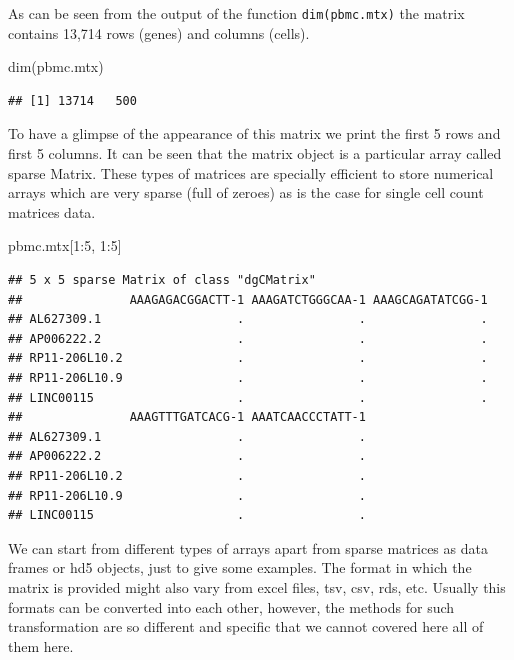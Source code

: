 \documentclass[
]{book}
\newenvironment{Shaded}{\begin{snugshade}}{\end{snugshade}}
\newcommand{\DecValTok}[1]{\textcolor[rgb]{0.00,0.00,0.81}{#1}}
\newcommand{\FunctionTok}[1]{\textcolor[rgb]{0.00,0.00,0.00}{#1}}
\newcommand{\NormalTok}[1]{#1}
\newcommand{\SpecialCharTok}[1]{\textcolor[rgb]{0.00,0.00,0.00}{#1}}
\begin{document}
As can be seen from the output of the function \texttt{dim(pbmc.mtx)} the matrix contains 13,714 rows (genes) and columns (cells).

\begin{Shaded}
\begin{Highlighting}[]
\FunctionTok{dim}\NormalTok{(pbmc.mtx)}
\end{Highlighting}
\end{Shaded}

\begin{verbatim}
## [1] 13714   500
\end{verbatim}

To have a glimpse of the appearance of this matrix we print the first 5 rows and first 5 columns. It can
be seen that the matrix object is a particular array called sparse Matrix. These types of matrices are
specially efficient to store numerical arrays which are very sparse (full of zeroes) as is the case
for single cell count matrices data.

\begin{Shaded}
\begin{Highlighting}[]
\NormalTok{pbmc.mtx[}\DecValTok{1}\SpecialCharTok{:}\DecValTok{5}\NormalTok{, }\DecValTok{1}\SpecialCharTok{:}\DecValTok{5}\NormalTok{]}
\end{Highlighting}
\end{Shaded}

\begin{verbatim}
## 5 x 5 sparse Matrix of class "dgCMatrix"
##               AAAGAGACGGACTT-1 AAAGATCTGGGCAA-1 AAAGCAGATATCGG-1
## AL627309.1                   .                .                .
## AP006222.2                   .                .                .
## RP11-206L10.2                .                .                .
## RP11-206L10.9                .                .                .
## LINC00115                    .                .                .
##               AAAGTTTGATCACG-1 AAATCAACCCTATT-1
## AL627309.1                   .                .
## AP006222.2                   .                .
## RP11-206L10.2                .                .
## RP11-206L10.9                .                .
## LINC00115                    .                .
\end{verbatim}

We can start from different types of arrays apart from sparse matrices as data frames or hd5
objects, just to give some examples. The format in which the matrix is provided might also vary from
excel files, tsv, csv, rds, etc. Usually this formats can be converted into each other, however, the
methods for such transformation are so different and specific that we cannot covered here all of them
here.
\end{document}

